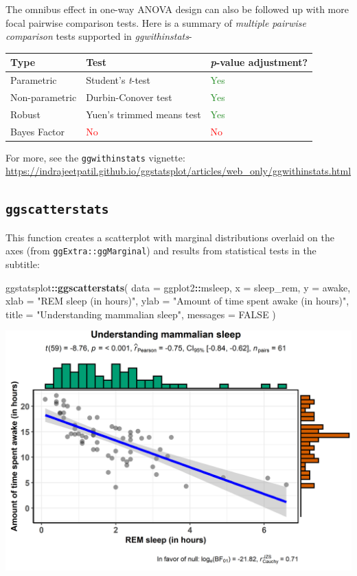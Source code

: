 \documentclass[
]{article}
\newenvironment{Shaded}{\begin{snugshade}}{\end{snugshade}}
\newcommand{\DataTypeTok}[1]{\textcolor[rgb]{0.13,0.29,0.53}{#1}}
\newcommand{\KeywordTok}[1]{\textcolor[rgb]{0.13,0.29,0.53}{\textbf{#1}}}
\newcommand{\NormalTok}[1]{#1}
\newcommand{\OperatorTok}[1]{\textcolor[rgb]{0.81,0.36,0.00}{\textbf{#1}}}
\newcommand{\OtherTok}[1]{\textcolor[rgb]{0.56,0.35,0.01}{#1}}
\newcommand{\StringTok}[1]{\textcolor[rgb]{0.31,0.60,0.02}{#1}}
\begin{document}
The omnibus effect in one-way ANOVA design can also be followed up with more
focal pairwise comparison tests. Here is a summary of \emph{multiple pairwise
comparison} tests supported in \emph{ggwithinstats}-

\begin{longtable}[]{@{}lll@{}}
\toprule
Type & Test & \emph{p}-value adjustment?\tabularnewline
\midrule
\endhead
Parametric & Student's \emph{t}-test & \textcolor{ForestGreen}{Yes}\tabularnewline
Non-parametric & Durbin-Conover test & \textcolor{ForestGreen}{Yes}\tabularnewline
Robust & Yuen's trimmed means test & \textcolor{ForestGreen}{Yes}\tabularnewline
Bayes Factor & \textcolor{red}{No} & \textcolor{red}{No}\tabularnewline
\bottomrule
\end{longtable}

For more, see the \texttt{ggwithinstats} vignette:
\url{https://indrajeetpatil.github.io/ggstatsplot/articles/web_only/ggwithinstats.html}

\hypertarget{ggscatterstats}{%
\subsection{\texorpdfstring{\texttt{ggscatterstats}}{ggscatterstats}}\label{ggscatterstats}}

This function creates a scatterplot with marginal distributions overlaid on the
axes (from \texttt{ggExtra::ggMarginal}) and results from statistical tests in the
subtitle:

\begin{Shaded}
\begin{Highlighting}[]
\NormalTok{ggstatsplot}\OperatorTok{::}\KeywordTok{ggscatterstats}\NormalTok{(}
  \DataTypeTok{data =}\NormalTok{ ggplot2}\OperatorTok{::}\NormalTok{msleep,}
  \DataTypeTok{x =}\NormalTok{ sleep\_rem,}
  \DataTypeTok{y =}\NormalTok{ awake,}
  \DataTypeTok{xlab =} \StringTok{"REM sleep (in hours)"}\NormalTok{,}
  \DataTypeTok{ylab =} \StringTok{"Amount of time spent awake (in hours)"}\NormalTok{,}
  \DataTypeTok{title =} \StringTok{"Understanding mammalian sleep"}\NormalTok{,}
  \DataTypeTok{messages =} \OtherTok{FALSE}
\NormalTok{)}
\end{Highlighting}
\end{Shaded}

\includegraphics[width=1\linewidth]{./figures/paper-ggscatterstats1-1}
\end{document}
